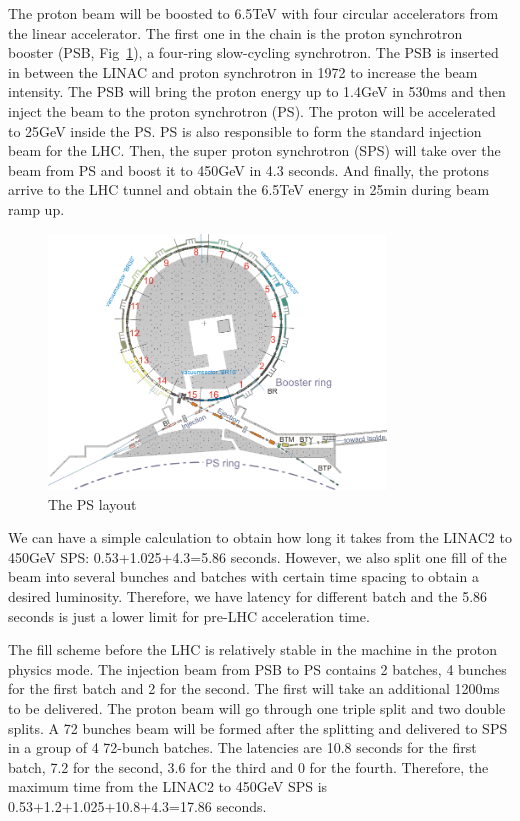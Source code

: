 The proton beam will be boosted to 6.5TeV with four circular accelerators from the linear accelerator. The first one in the chain is the proton synchrotron booster (PSB, Fig~\ref{fig:c3lhcpsb}), a four-ring slow-cycling synchrotron. The PSB is inserted in between the LINAC and proton synchrotron in 1972 to increase the beam intensity. The PSB will bring the proton energy up to 1.4GeV in 530ms and then inject the beam to the proton synchrotron (PS). The proton will be accelerated to 25GeV inside the PS. PS is also responsible to form the standard injection beam for the LHC. Then, the super proton synchrotron (SPS) will take over the beam from PS and boost it to 450GeV in 4.3 seconds. And finally, the protons arrive to the LHC tunnel and obtain the 6.5TeV energy in 25min during beam ramp up. 

\begin{figure}[htbp]
 \begin{center}
  \includegraphics[width=0.8\textwidth]{figures/c3/c3_lhc_psb.png}
 \end{center}
 \caption{The PS layout}
 \label{fig:c3lhcpsb}
\end{figure}

We can have a simple calculation to obtain how long it takes from the LINAC2 to 450GeV SPS: 0.53+1.025+4.3=5.86 seconds. However, we also split one fill of the beam into several bunches and batches with certain time spacing to obtain a desired luminosity. Therefore, we have latency for different batch and the 5.86 seconds is just a lower limit for pre-LHC acceleration time. 

The fill scheme before the LHC is relatively stable in the machine in the proton physics mode. The injection beam from PSB to PS contains 2 batches, 4 bunches for the first batch and 2 for the second. The first will take an additional 1200ms to be delivered. The proton beam will go through one triple split and two double splits. A 72 bunches beam will be formed after the splitting and delivered to SPS in a group of 4 72-bunch batches. The latencies are 10.8 seconds for the first batch, 7.2 for the second, 3.6 for the third and 0 for the fourth. Therefore, the maximum time from the LINAC2 to 450GeV SPS is 0.53+1.2+1.025+10.8+4.3=17.86 seconds. 

